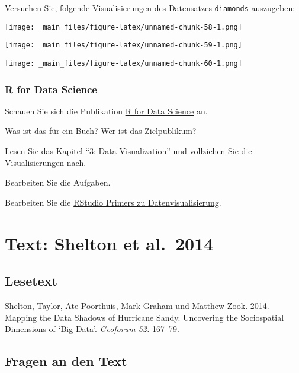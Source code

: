 \documentclass[11pt,german,a4paper]{article}
\begin{document}
Versuchen Sie, folgende Visualisierungen des Datensatzes \texttt{diamonds} auszugeben:

\texttt{[image: \_main\_files/figure-latex/unnamed-chunk-58-1.png]}

\texttt{[image: \_main\_files/figure-latex/unnamed-chunk-59-1.png]}

\texttt{[image: \_main\_files/figure-latex/unnamed-chunk-60-1.png]}

\hypertarget{r-for-data-science}{%
\subsubsection{R for Data Science}\label{r-for-data-science}}

Schauen Sie sich die Publikation \href{https://r4ds.had.co.nz/}{R for Data Science} an.

Was ist das für ein Buch? Wer ist das Zielpublikum?

Lesen Sie das Kapitel ``3: Data Visualization'' und vollziehen Sie die Visualisierungen nach.

Bearbeiten Sie die Aufgaben.

Bearbeiten Sie die \href{https://rstudio.cloud/learn/primers/3}{RStudio Primers zu Datenvisualisierung}.

\hypertarget{text-shelton-et-al.-2014}{%
\section{Text: Shelton et al.~2014}\label{text-shelton-et-al.-2014}}

\hypertarget{lesetext-1}{%
\subsection*{Lesetext}\label{lesetext-1}}

Shelton, Taylor, Ate Poorthuis, Mark Graham und Matthew Zook. 2014. Mapping the Data Shadows of Hurricane Sandy. Uncovering the Sociospatial Dimensions of `Big Data'. \emph{Geoforum 52.} 167--79.

\hypertarget{fragen-an-den-text-1}{%
\subsection*{Fragen an den Text}\label{fragen-an-den-text-1}}
\end{document}
